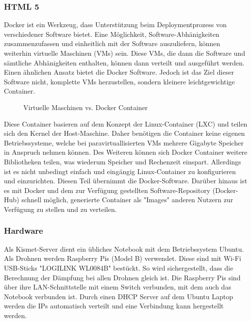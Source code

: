 \documentclass[a4paper]{spie}  %
\begin{document}
\subsubsection{HTML 5}
Docker ist ein Werkzeug, dass Unterstützung beim Deploymentprozess von verschiedener Software bietet. Eine Möglichkeit, Software-Abhänigkeiten zusammenzufassen und einheitlich mit der Software auszuliefern, können weiterhin virtuelle Maschinen (VMs) sein. Diese VMs, die dann die Software und sämtliche Abhänigkeiten enthalten, können dann verteilt und ausgeführt werden. Einen ähnlichen Ansatz bietet die Docker Software. Jedoch ist das Ziel dieser Software nicht, komplette VMs herzustellen, sondern kleinere leichtgewichtige Container.

\begin{figure}[h!]
	\centering
		\caption{Virtuelle Maschinen vs. Docker Container\cite{dockercontainer}}
		\label{fig:dockerVM}
\end{figure}

Diese Container basieren auf dem Konzept der Linux-Container (LXC) und teilen sich den Kernel der Host-Maschine. Daher benötigen die Container keine eigenen Betriebssysteme, welche bei paravirtuallisierten VMs mehrere Gigabyte Speicher in Anspruch nehmen können. Des Weiteren können sich Docker Container weitere Bibliotheken teilen, was wiederum Speicher und Rechenzeit einspart. Allerdings ist es nicht unbedingt einfach und eingängig Linux-Container zu konfigurieren und einzurichten. Diesen Teil übernimmt die Docker-Software. Darüber hinaus ist es mit Docker und dem zur Verfügung gestellten Software-Repository (Docker-Hub) schnell möglich, generierte Container als "Images" anderen Nutzern zur Verfügung zu stellen und zu verteilen.

\subsubsection{Hardware}
Als Kismet-Server dient ein übliches Notebook mit dem Betriebssystem Ubuntu. Als Drohnen werden Raspberry Pis (Model B) verwendet. Diese sind mit Wi-Fi USB-Sticks "LOGILINK WL0084B" bestückt. So wird sichergestellt, dass die Berechnung der Dämpfung bei allen Drohnen gleich ist.
Die Raspberry Pis sind über ihre LAN-Schnittstelle mit einem Switch verbunden, mit dem auch das Notebook verbunden ist. Durch einen DHCP Server auf dem Ubuntu Laptop werden die IPs automatisch verteilt und eine Verbindung kann hergestellt werden.
\end{document}
